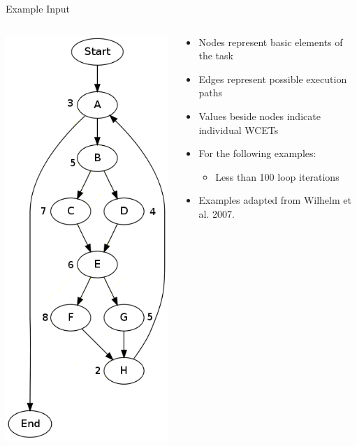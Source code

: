 \documentclass{beamer}
\begin{document}
\begin{frame}{Example Input}
  \begin{columns}
    \begin{column}{0.25\textwidth}
      \includegraphics[scale=0.3]{input.png}
    \end{column}
    \begin{column}{0.75\textwidth}
      \begin{itemize}
        \item Nodes represent basic elements of the task
        \item Edges represent possible execution paths
        \item Values beside nodes indicate individual WCETs
        \item For the following examples:
          \begin{itemize}
            \item Less than 100 loop iterations
          \end{itemize}
        \item {\footnotesize{Examples adapted from Wilhelm et al. 2007.}}
      \end{itemize}
    \end{column}
  \end{columns}
\end{frame}
\end{document}
